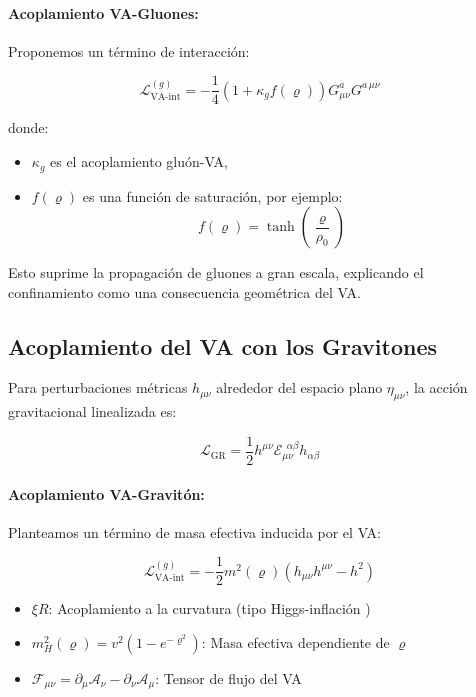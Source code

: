 \documentclass[twoside]{article}
\theoremstyle{definition}
\theoremstyle{remark}
\numberwithin{equation}{section}
\theoremstyle{definition}
\theoremstyle{example}
\theoremstyle{remark}
\numberwithin{equation}{section}%
\begin{document}
		\paragraph{Acoplamiento VA-Gluones:}
		Proponemos un término de interacción:
		
		\begin{equation}
			\mathcal{L}_{\text{VA-int}}^{(g)} = -\frac{1}{4} \left(1 + \kappa_g f(\varrho) \right) G^a_{\mu\nu} G^{a\,\mu\nu}
		\end{equation}
		
		donde:
		\begin{itemize}
			\item \( \kappa_g \) es el acoplamiento gluón-VA,
			\item \( f(\varrho) \) es una función de saturación, por ejemplo:
			\begin{equation}
				f(\varrho) = \tanh\left(\frac{\varrho}{\rho_0}\right)
			\end{equation}
		\end{itemize}
		
		Esto suprime la propagación de gluones a gran escala, explicando el confinamiento como una consecuencia geométrica del VA.
		
		\subsection{Acoplamiento del VA con los Gravitones}
		
		Para perturbaciones métricas \( h_{\mu\nu} \) alrededor del espacio plano \( \eta_{\mu\nu} \), la acción gravitacional linealizada es:
		
		\begin{equation}
			\mathcal{L}_{\text{GR}} = \frac{1}{2} h^{\mu\nu} \mathcal{E}_{\mu\nu}^{\ \ \alpha\beta} h_{\alpha\beta}
		\end{equation}
		
		\paragraph{Acoplamiento VA-Gravitón:}
		Planteamos un término de masa efectiva inducida por el VA:
		
		\begin{equation}
			\mathcal{L}_{\text{VA-int}}^{(g)} = -\frac{1}{2} m^2(\varrho) \left(h_{\mu\nu} h^{\mu\nu} - h^2\right)
		\end{equation}
		
		\begin{itemize}
			\item \(\xi R\): Acoplamiento a la curvatura (tipo Higgs-inflación \cite{Bezrukov2008})
			\item \(m_H^2(\varrho) = v^2 (1 - e^{-\varrho^2})\): Masa efectiva dependiente de \(\varrho\)
			\item \(\mathcal{F}_{\mu\nu} = \partial_\mu \mathcal{A}_\nu - \partial_\nu \mathcal{A}_\mu\): Tensor de flujo del VA
		\end{itemize}
		
\end{document}
